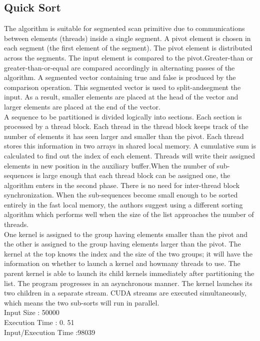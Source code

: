 \documentclass[journal]{IEEEtran}
\begin{document}
\subsection{Quick Sort}
The algorithm is suitable for segmented
scan primitive due to communications between elements (threads) inside a
single segment. A pivot element is chosen in each segment (the first element of the
segment). The pivot element is distributed across the segments. The input element is
compared to the pivot.Greater-than or greater-than-or-equal are compared accordingly
in alternating passes of the algorithm. A segmented vector containing true and false
is produced by the comparison operation. This segmented vector is used to split-andsegment
the input. As a result, smaller elements are placed at the head of the vector
and larger elements are placed at the end of the vector. \\
A sequence to be partitioned is divided logically into sections. Each section is
processed by a thread block. Each thread in the thread block keeps track of the number
of elements it has seen larger and smaller than the pivot. Each thread stores this
information in two arrays in shared local memory. A cumulative sum is calculated to
find out the index of each element. Threads will write their assigned elements in new
position in the auxiliary buffer.When the number of sub-sequences is large enough that
each thread block can be assigned one, the algorithm enters in the second phase. There
is no need for inter-thread block synchronization. When the sub-sequences become
small enough to be sorted entirely in the fast local memory, the authors suggest using
a different sorting algorithm which performs well when the size of the list approaches
the number of threads.\\
One kernel is assigned to the group having elements smaller than the pivot
and the other is assigned to the group having elements larger than the pivot. The kernel
at the top knows the index and the size of the two groups; it will have the information
on whether to launch a kernel and howmany threads to use. The parent kernel is able to
launch its child kernels immediately after partitioning the list. The program progresses
in an asynchronous manner. The kernel launches its two children in a separate stream.
CUDA streams are executed simultaneously, which means the two sub-sorts will run
in parallel.\\
Input Size : 50000\\
Execution Time : 0. 51\\
Input/Execution Time :98039\\
\end{document}
